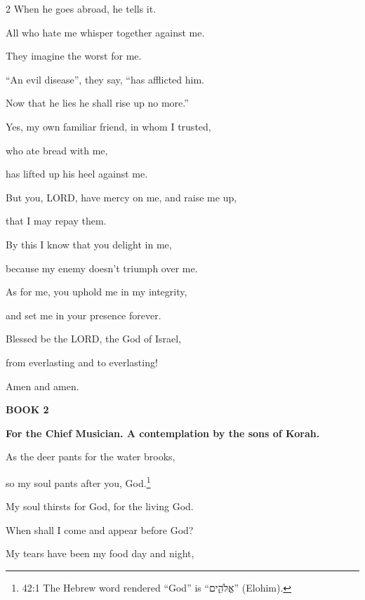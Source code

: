 \begin{multicols}{2}
	When he goes abroad, he tells it.
	
	
	\myverse{}All who hate me whisper together against me.
	
	They imagine the worst for me.
	
	
	\myverse{}“An evil disease”, they say, “has afflicted him.
	
	Now that he lies he shall rise up no more.”
	
	
	\myverse{}Yes, my own familiar friend, in whom I trusted,
	
	who ate bread with me,
	
	has lifted up his heel against me.
	
	\vspace{\baselineskip}
	
	\myverse{}But you, LORD, have mercy on me, and raise me up,
	
	that I may repay them.
	
	
	\myverse{}By this I know that you delight in me,
	
	because my enemy doesn’t triumph over me.
	
	
	\myverse{}As for me, you uphold me in my integrity,
	
	and set me in your presence forever.
	
	\vspace{\baselineskip}
	
	
	\myverse{}Blessed be the LORD, the God of Israel,
	
	from everlasting and to everlasting!
	
	Amen and amen.
	
	
	
	\vspace{\baselineskip}
	\begin{center}
		{\LARGE\textbf{BOOK 2}}
	\end{center}
	\vspace{-\baselineskip}
	
	\mychapter{}\textbf{For the Chief Musician. A contemplation by the sons of Korah.}
	
	\myverse*{}As the deer pants for the water brooks,
	
	so my soul pants after you, God.\footnote{42:1 The Hebrew word rendered “God” is “אֱלֹהִ֑ים” (Elohim).}
	
	
	\myverse{}My soul thirsts for God, for the living God.
	
	When shall I come and appear before God?
	
	
	\myverse{}My tears have been my food day and night,
	

\end{multicols}
